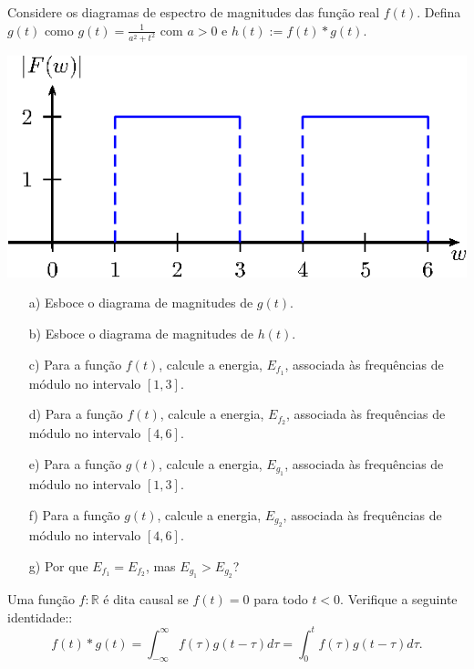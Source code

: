     
    \begin{exer} Considere os diagramas de espectro de magnitudes das função real $f(t)$. Defina $g(t)$ como $g(t)=\frac{1}{a^2+t^2}$ com $a>0$ e $h(t):= f(t)\ast g(t)$.
    
        \begin{center}
            \includegraphics{cap_propriedades_transformada/pics/diagrama_7C}
                \end{center}
        \begin{itemize}
            \item[a)] Esboce o diagrama de magnitudes de $g(t)$.
            \item[b)] Esboce o diagrama de magnitudes de $h(t)$.
            \item[c)] Para a função $f(t)$, calcule a energia, $E_{f_1}$, associada às frequências de módulo no intervalo $[1, 3]$.
            \item[d)] Para a função $f(t)$, calcule a energia, $E_{f_2}$, associada às frequências de módulo no intervalo $[4, 6]$.
            \item[e)] Para a função $g(t)$, calcule a energia, $E_{g_1}$, associada às frequências de módulo no intervalo $[1, 3]$.
            \item[f)] Para a função $g(t)$, calcule a energia, $E_{g_2}$, associada às frequências de módulo no intervalo $[4, 6]$.
            \item[g)] Por que $E_{f_1} = E_{f_2}$, mas $E_{g_1} > E_{g_2}$?
        \end{itemize}    
    \end{exer}
    

    \begin{exer} Uma função $f:\mathbb{R}$ é dita causal se $f(t)=0$ para todo $t<0$. Verifique a seguinte identidade::
        $$f(t)\ast g(t)=\int_{-\infty}^\infty f(\tau)g(t-\tau)d\tau=\int_{0}^t f(\tau)g(t-\tau)d\tau. $$
      \end{exer}

